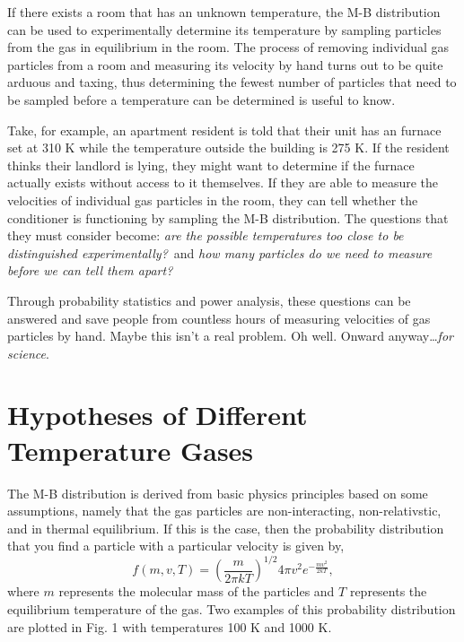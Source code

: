 \documentclass[%
 reprint,
 amsmath,amssymb,
 aps,
]{revtex4-2}
\begin{document}
If there exists a room that has an unknown temperature, the M-B distribution can be used to experimentally determine its temperature by sampling particles from the gas in equilibrium in the room. The process of removing individual gas particles from a room and measuring its velocity by hand turns out to be quite arduous and taxing, thus determining the fewest number of particles that need to be sampled before a temperature can be determined is useful to know.

Take, for example, an apartment resident is told that their unit has an furnace set at 310 K while the temperature outside the building is 275 K. If the resident thinks their landlord is lying, they might want to determine if the furnace actually exists without access to it themselves. If they are able to measure the velocities of individual gas particles in the room, they can tell whether the conditioner is functioning by sampling the M-B distribution. The questions that they must consider become: \textit{are the possible temperatures too close to be distinguished experimentally?}\ and \textit{how many particles do we need to measure before we can tell them apart?}

Through probability statistics and power analysis, these questions can be answered and save people from countless hours of measuring velocities of gas particles by hand. Maybe this isn't a real problem. Oh well. Onward anyway\dots \textit{for science}.

\section{Hypotheses of Different Temperature Gases}

The M-B distribution is derived from basic physics principles based on some assumptions, namely that the gas particles are non-interacting, non-relativstic, and in thermal equilibrium. If this is the case, then the probability distribution that you find a particle with a particular velocity is given by,
\[
	f(m, v, T) = \left( \frac{m}{2\pi k T} \right)^{1/2}4\pi v^2 e^{-\frac{mv^2}{2kT}},
\]
where $m$ represents the molecular mass of the particles and $T$ represents the equilibrium temperature of the gas. Two examples of this probability distribution are plotted in Fig. 1 with temperatures 100 K and 1000 K. 
\end{document}
